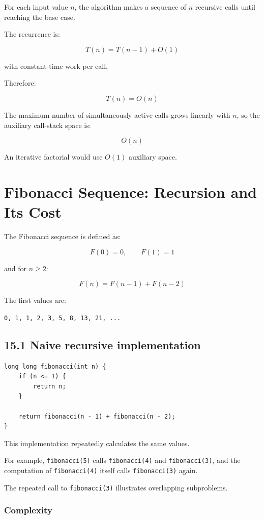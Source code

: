 For each input value $n$, the algorithm makes a sequence of $n$ recursive calls until reaching the base case.

The recurrence is:


\[
T(n)=T(n-1)+O(1)
\]


with constant-time work per call.

Therefore:


\[
\boxed{T(n)=O(n)}
\]


The maximum number of simultaneously active calls grows linearly with $n$, so the auxiliary call-stack space is:


\[
\boxed{O(n)}
\]


An iterative factorial would use $O(1)$ auxiliary space.

\section{Fibonacci Sequence: Recursion and Its Cost}

The Fibonacci sequence is defined as:


\[
F(0)=0,\qquad F(1)=1
\]


and for $n\geq2$:


\[
\boxed{F(n)=F(n-1)+F(n-2)}
\]


The first values are:

\texttt{0, 1, 1, 2, 3, 5, 8, 13, 21, ...}

\subsection{15.1 Naive recursive implementation}

\begin{lstlisting}[style=cppstyle]
long long fibonacci(int n) {
    if (n <= 1) {
        return n;
    }

    return fibonacci(n - 1) + fibonacci(n - 2);
}
\end{lstlisting}

This implementation repeatedly calculates the same values.

For example, \texttt{fibonacci(5)} calls \texttt{fibonacci(4)} and \texttt{fibonacci(3)}, and the computation of \texttt{fibonacci(4)} itself calls \texttt{fibonacci(3)} again.

The repeated call to \texttt{fibonacci(3)} illustrates overlapping subproblems.

\subsubsection{Complexity}

